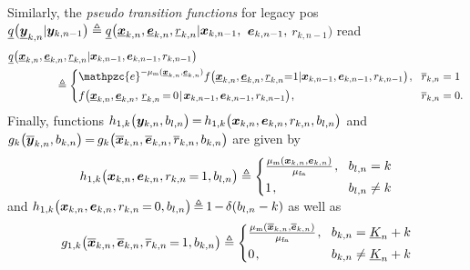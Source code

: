 \documentclass[11pt,a4paper]{article}
\newcommand{\ist}{\hspace*{.3mm}}
\newcommand{\rmv}{\hspace*{-.3mm}}
\newcommand{\nn}{\nonumber}
\begin{document}
Similarly, the \textit{pseudo transition functions} for legacy \acp{po} $\underline{q}\big(\underline{\bm{y}}_{k,n} | \bm{y}_{k,n-1} \big) \triangleq \underline{q}\big(\underline{\bm{x}}_{k,n}, \underline{\bm{e}}_{k,n}, \underline{r}_{k,n} | \bm{x}_{k,n-1},$ $\bm{e}_{k,n-1},$ $r_{k,n-1} \big)$ \vspace{-1.8mm} read
\begin{align}
&\underline{q}\big(\underline{\V{x}}_{k,n}, \underline{\V{e}}_{k,n}, \underline{r}_{k,n} | \V{x}_{k,n-1}, \V{e}_{k,n-1}, r_{k,n-1} \big) \nn\\
&\hspace{15mm} \triangleq \begin{cases}
      \mathpzc{e}^{-\mu_{\mathrm{m}} (\underline{\V{x}}_{k,n}, \underline{\V{e}}_{k,n}) } f\big(\underline{\V{x}}_{k,n}, \underline{\V{e}}_{k,n},\underline{r}_{k,n} \rmv\rmv\rmv=\rmv\rmv\rmv  1 |\V{x}_{k,n-1},\V{e}_{k,n-1},r_{k,n-1} \big)  \ist, 
       & \rmv\rmv \overline{r}_{k,n} = 1 \\[1mm]
      f\big(\underline{\V{x}}_{k,n}, \underline{\V{e}}_{k,n},$ $\underline{r}_{k,n} \rmv=\rmv  0 \ist | \ist \V{x}_{k,n-1}, \V{e}_{k,n-1}, r_{k,n-1} \big) \ist,  & \rmv\rmv \overline{r}_{k,n} = 0.
  \end{cases} \nn\\[-11mm]
    \nn\\
  \nn
\end{align}
Finally, functions $h_{1,k}\big( \V{y}_{k,n}, b_{l,n} \big) \rmv=\rmv h_{1,k}\big( \V{x}_{k,n},  \V{e}_{k,n},  r_{k,n},  b_{l,n} \big)$ and $g_k\big( \overline{\V{y}}_{k,n}, b_{k,n} \big) \rmv=\rmv g_k\big(\overline{\V{x}}_{k,n}, \overline{\V{e}}_{k,n},  \overline{r}_{k,n},  b_{k,n} \big)$ are given\vspace{-3mm} by
\begin{align}
&h_{1,k}\big(  \V{x}_{k,n}, \V{e}_{k,n}, r_{k,n} \rmv=\rmv 1, b_{l,n} \big) \triangleq \begin{cases}
       \frac{\mu_{\mathrm{m}}(\V{x}_{k,n},\V{e}_{k,n})}{\mu_{\mathrm{fa}}}   \ist, 
       & \rmv\rmv b_{l,n} = k \\[1mm]
     1 \ist,  & \rmv\rmv b_{l,n} \neq k 
  \end{cases} \nn\\[-8mm]
  \nn
\end{align}
and $h_{1,k}\big( \V{x}_{k,n}, \V{e}_{k,n}, r_{k,n} \rmv=\rmv 0,  b_{l,n}  \big) \rmv\triangleq\rmv 1 \rmv-\rmv \delta(b_{l,n} - k )$ as well \vspace{-1.5mm} as 
\begin{align}
&g_{1,k}\big(  \overline{\V{x}}_{k,n}, \overline{\V{e}}_{k,n}, \overline{r}_{k,n} \rmv=\rmv 1, b_{k,n}  \big) \triangleq \begin{cases}
       \frac{\mu_{\mathrm{m}} (\overline{\V{x}}_{k,n},\overline{\V{e}}_{k,n})}{\mu_{\mathrm{fa}}}   \ist, 
       & \rmv\rmv b_{k,n} = \underline{K}_n + k \\[1mm]
     0 \ist,  & \rmv\rmv b_{k,n} \neq \underline{K}_n + k 
  \end{cases} \nn\\[-8mm]
  \nn
\end{align}
\end{document}
